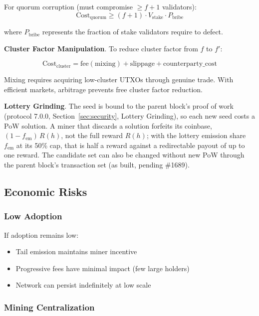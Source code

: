 For quorum corruption (must compromise $\geq f + 1$ validators):
\begin{equation}
\text{Cost}_{\text{quorum}} \geq (f + 1) \cdot V_{\text{stake}} \cdot P_{\text{bribe}}
\end{equation}

where $P_{\text{bribe}}$ represents the fraction of stake validators require
to defect.

\textbf{Cluster Factor Manipulation}.
To reduce cluster factor from $f$ to $f'$:

\begin{equation}
\text{Cost}_{\text{cluster}} = \text{fee}(\text{mixing}) + \text{slippage} + \text{counterparty\_cost}
\end{equation}

Mixing requires acquiring low-cluster UTXOs through genuine trade. With
efficient markets, arbitrage prevents free cluster factor reduction.

\textbf{Lottery Grinding}.
The seed is bound to the parent block's proof of work (protocol 7.0.0,
Section~\ref{sec:security}, Lottery Grinding), so each new seed costs a PoW
solution. A miner that discards a solution forfeits its coinbase,
$(1-f_{\text{em}})\,R(h)$, not the full reward $R(h)$; with the lottery
emission share $f_{\text{em}}$ at its 50\% cap, that is half a reward against
a redirectable payout of up to one reward. The candidate set can also be
changed without new PoW through the parent block's transaction set (as
built, pending \#1689).

\subsection{Economic Risks}

\subsubsection{Low Adoption}

If adoption remains low:
\begin{itemize}
  \item Tail emission maintains miner incentive
  \item Progressive fees have minimal impact (few large holders)
  \item Network can persist indefinitely at low scale
\end{itemize}

\subsubsection{Mining Centralization}

